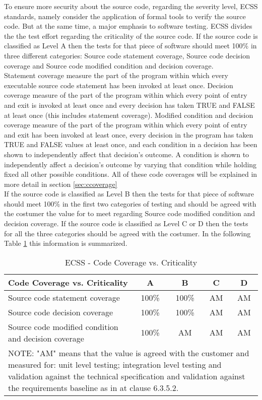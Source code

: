 To ensure more security about the source code, regarding the severity level, \ac{ECSS} standards, namely \cite{ecss-q-st-40c}
consider the application of formal tools to verify the source code. But at the same time, a major emphasis to software testing.
\ac{ECSS} divides the the test effort regarding the criticality of the source code.
If the source code is classified as Level A then the tests for that piece of software should meet 100\% in
three different categories: Source code statement coverage, Source code decision coverage and Source code modified condition and decision coverage.\\
Statement coverage measure the part of the program within which every executable source code statement has been invoked at least once.
Decision coverage measure of the part of the program within which every point of entry and exit
is invoked at least once and every decision has taken TRUE and FALSE
at least once (this includes statement coverage).
Modified condition and decision coverage measure of the part of the program within which every point of entry and exit
has been invoked at least once, every decision in the program has taken TRUE and FALSE values at least once, and each condition in a decision has been
shown to independently affect that decision's outcome. A condition is shown to independently affect a
decision's outcome by varying that condition while holding fixed all other possible conditions. All of these code coverages will be explained in more detail in section
\ref{sec:ccoverage}\\
If the source code is classified as Level B then the tests for that piece of software should meet 100\% in the first two categories of testing and should be
agreed with the costumer the value for to meet regarding Source code modified condition and decision coverage.
If the source code is classified as Level C or D then the tests for all the three categories should be agreed with the costumer.
In the following Table \ref{tab:ccoverage} this information is summarized.

\begin{table}[!ht]
\centering
\noindent \begin{tabular}{|m{6cm}|c|c|c|c|}
\hline
\textbf{Code Coverage vs. Criticality} & A & B & C & D \\\hline
Source code statement coverage & 100\% & 100\% & AM & AM \\\hline
Source code decision coverage & 100\% & 100\% & AM & AM \\\hline
Source code modified condition and decision coverage & 100\% & AM & AM & AM \\\hline
\multicolumn{5}{|m{14cm}|}{
NOTE: "AM" means that the value is agreed with the customer and measured for:
unit level testing; integration level testing and validation against the
technical specification and validation against the requirements baseline
as in \cite{ecss-q-st-80c} at clause 6.3.5.2.
}\\\hline
\end{tabular}
\caption{\protect\ac{ECSS} - Code Coverage vs. Criticality}\label{tab:ccoverage}
\end{table}


